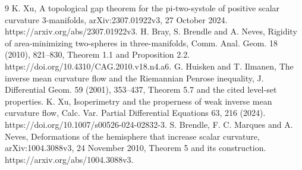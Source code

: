 \documentclass[10pt]{article}
\begin{document}
9 K. Xu, A topological gap theorem for the pi-two-systole of positive scalar curvature 3-manifolds, arXiv:2307.01922v3, 27 October 2024. https://arxiv.org/abs/2307.01922v3. H. Bray, S. Brendle and A. Neves, Rigidity of area-minimizing two-spheres in three-manifolds, Comm. Anal. Geom. 18 (2010), 821–830, Theorem 1.1 and Proposition 2.2. https://doi.org/10.4310/CAG.2010.v18.n4.a6. G. Huisken and T. Ilmanen, The inverse mean curvature flow and the Riemannian Penrose inequality, J. Differential Geom. 59 (2001), 353–437, Theorem 5.7 and the cited level-set properties. K. Xu, Isoperimetry and the properness of weak inverse mean curvature flow, Calc. Var. Partial Differential Equations 63, 216 (2024). https://doi.org/10.1007/s00526-024-02832-3. S. Brendle, F. C. Marques and A. Neves, Deformations of the hemisphere that increase scalar curvature, arXiv:1004.3088v3, 24 November 2010, Theorem 5 and its construction. https://arxiv.org/abs/1004.3088v3.\par
\end{document}
